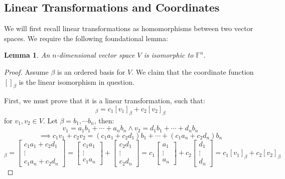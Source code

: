 \documentclass[10pt,letterpaper]{article} %
\newtheorem{lem}{Lemma}[section]
\begin{document}
\subsection{Linear Transformations and Coordinates}
We will first recall linear transformations as homomorphisms between two vector spaces. We require the following foundational lemma:
\begin{lem}
An $n$-dimensional vector space $V$ is isomorphic to $\mathbb{F}^n$.
\end{lem}
\begin{proof}
Assume $\beta$ is an ordered basis for $V$. We claim that the coordinate function $[]_{\beta}$ is the linear isomorphism in question.

First, we must prove that it is a linear transformation, such that:
\begin{equation*}
[c_1v_1 + c_2v_2]_{\beta} = c_1[v_1]_{\beta} + c_2[v_2]_{\beta}
\end{equation*}
for $v_1, v_2 \in V$. Let $\beta = {b_1, \cdots b_n}$, then:
\begin{equation*}
v_1 = a_1b_1 + \cdots + a_nb_n \land v_2 = d_1b_1 + \cdots + d_nb_n
\end{equation*}
\begin{equation*}
\implies c_1v_1 + c_2v_2 = (c_1a_1 + c_2d_1)b_1 + \cdots + (c_1a_n + c_2d_n)b_n
\end{equation*}
\begin{equation*}
[c_1v_1 + c_2v_2]_{\beta} = \begin{bmatrix}
c_1a_1 + c_2d_1\\ \vdots \\ c_1a_n + c_2d_n
\end{bmatrix} = \begin{bmatrix}
c_1a_1\\ \vdots \\ c_1a_n
\end{bmatrix} + \begin{bmatrix}
c_2d_1 \\ \vdots \\ c_2d_n
\end{bmatrix} = c_1\begin{bmatrix}
a_1 \\ \vdots \\ a_n
\end{bmatrix} + c_2\begin{bmatrix}
d_1 \\ \vdots \\ d_n
\end{bmatrix} = c_1[v_1]_{\beta} + c_2[v_2]_\beta

\end{equation*}
\end{proof}
\end{document}
